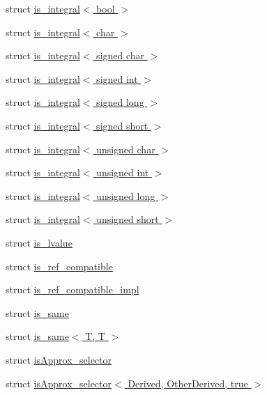 \begin{DoxyCompactItemize}
\item 
struct \hyperlink{struct_eigen_1_1internal_1_1is__integral_3_01bool_01_4}{is\+\_\+integral$<$ bool $>$}
\item 
struct \hyperlink{struct_eigen_1_1internal_1_1is__integral_3_01char_01_4}{is\+\_\+integral$<$ char $>$}
\item 
struct \hyperlink{struct_eigen_1_1internal_1_1is__integral_3_01signed_01char_01_4}{is\+\_\+integral$<$ signed char $>$}
\item 
struct \hyperlink{struct_eigen_1_1internal_1_1is__integral_3_01signed_01int_01_4}{is\+\_\+integral$<$ signed int $>$}
\item 
struct \hyperlink{struct_eigen_1_1internal_1_1is__integral_3_01signed_01long_01_4}{is\+\_\+integral$<$ signed long $>$}
\item 
struct \hyperlink{struct_eigen_1_1internal_1_1is__integral_3_01signed_01short_01_4}{is\+\_\+integral$<$ signed short $>$}
\item 
struct \hyperlink{struct_eigen_1_1internal_1_1is__integral_3_01unsigned_01char_01_4}{is\+\_\+integral$<$ unsigned char $>$}
\item 
struct \hyperlink{struct_eigen_1_1internal_1_1is__integral_3_01unsigned_01int_01_4}{is\+\_\+integral$<$ unsigned int $>$}
\item 
struct \hyperlink{struct_eigen_1_1internal_1_1is__integral_3_01unsigned_01long_01_4}{is\+\_\+integral$<$ unsigned long $>$}
\item 
struct \hyperlink{struct_eigen_1_1internal_1_1is__integral_3_01unsigned_01short_01_4}{is\+\_\+integral$<$ unsigned short $>$}
\item 
struct \hyperlink{struct_eigen_1_1internal_1_1is__lvalue}{is\+\_\+lvalue}
\item 
struct \hyperlink{struct_eigen_1_1internal_1_1is__ref__compatible}{is\+\_\+ref\+\_\+compatible}
\item 
struct \hyperlink{struct_eigen_1_1internal_1_1is__ref__compatible__impl}{is\+\_\+ref\+\_\+compatible\+\_\+impl}
\item 
struct \hyperlink{struct_eigen_1_1internal_1_1is__same}{is\+\_\+same}
\item 
struct \hyperlink{struct_eigen_1_1internal_1_1is__same_3_01_t_00_01_t_01_4}{is\+\_\+same$<$ T, T $>$}
\item 
struct \hyperlink{struct_eigen_1_1internal_1_1is_approx__selector}{is\+Approx\+\_\+selector}
\item 
struct \hyperlink{struct_eigen_1_1internal_1_1is_approx__selector_3_01_derived_00_01_other_derived_00_01true_01_4}{is\+Approx\+\_\+selector$<$ Derived, Other\+Derived, true $>$}

\end{DoxyCompactItemize}
